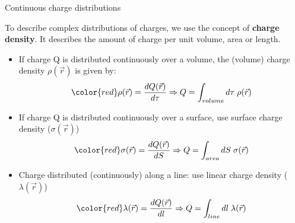 \begin{frame}{Continuous charge distributions}

To describe complex distributions of charges, we use the concept of {\bf charge density}.
It describes the amount of charge per unit volume, area or length.\\
\vspace{0.2cm}
\begin{itemize}
\item
If charge Q is distributed continuously over a volume, the (volume) charge density $\rho(\vec{r})$ is given by:
\begin{equation*}
   {\color{red} \rho(\vec{r}) = \frac{dQ(\vec{r})}{d\tau} } \Rightarrow
   Q = \int_{volume} d\tau \; \rho(\vec{r})
\end{equation*}
\item
If charge Q is distributed continuously over a surface, use surface charge density ($\sigma(\vec{r})$)
\begin{equation*}
   {\color{red} \sigma(\vec{r}) = \frac{dQ(\vec{r})}{dS} } \Rightarrow
   Q = \int_{area} dS \; \sigma(\vec{r})
\end{equation*}
\item
Charge distributed (continuously) along a line: use linear charge density ($\lambda(\vec{r})$)
\begin{equation*}
   {\color{red} \lambda(\vec{r}) = \frac{dQ(\vec{r})}{dl} } \Rightarrow
   Q = \int_{line} dl \; \lambda(\vec{r})
\end{equation*}
\end{itemize}

\end{frame}

%
%
%

